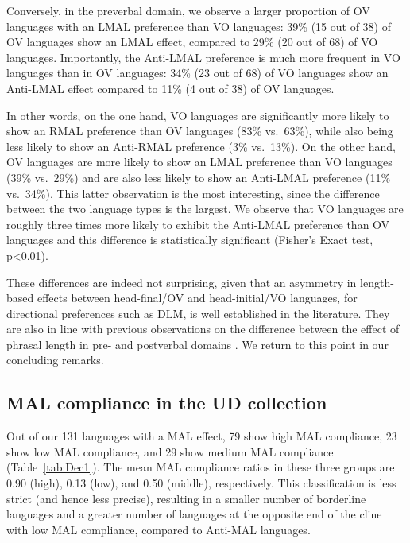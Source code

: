 Conversely, in the preverbal domain, we observe a larger proportion of OV languages with an LMAL preference than VO languages: 39\% (15 out of 38) of OV languages show an LMAL effect, compared to 29\% (20 out of 68) of VO languages.
Importantly, the Anti-LMAL preference is much more frequent in VO languages than in OV languages: 34\% (23 out of 68) of VO languages show an Anti-LMAL effect compared to 11\% (4 out of 38) of OV languages.

In other words, on the one hand, VO languages are significantly more likely to show an RMAL preference than OV languages (83\% vs.\ 63\%), while also being less likely to show an Anti-RMAL preference (3\% vs.\ 13\%). On the other hand, OV languages are more likely to show an LMAL preference than VO languages (39\% vs.\ 29\%) and are also less likely to show an Anti-LMAL preference (11\% vs.\ 34\%). This latter observation is the most interesting, since the difference between the two language types is the largest. We observe that VO languages are roughly three times more likely to exhibit the Anti-LMAL preference than OV languages and this difference is statistically significant (Fisher's Exact test, p<0.01). 

These differences are indeed not surprising, given that an asymmetry in length-based effects between head-final/OV and head-initial/VO languages, for directional preferences such as DLM, is well established in the literature.
They are also in line with previous observations on the difference between the effect of phrasal length in pre- and postverbal domains \citep{faghiriGlossa2020}. We return to this point in our concluding remarks.


\subsection{MAL compliance in the UD collection}\label{results2}

Out of our 131 languages with a MAL effect, 79 show high MAL compliance, 23 show low MAL compliance, and 29 show medium MAL compliance (Table~\ref{tab:Dec1}). The mean MAL compliance ratios in these three groups are 0.90 (high), 0.13 (low), and 0.50 (middle), respectively. This classification is less strict (and hence less precise), resulting in a smaller number of borderline languages and a greater number of languages at the opposite end of the cline with low MAL compliance, compared to Anti-MAL languages.

